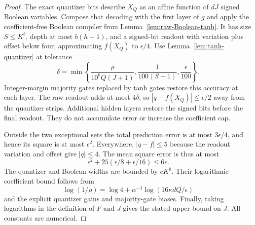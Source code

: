 \begin{proof}
The exact quantizer bits describe $X_Q$ as an affine function of
$dJ$ signed Boolean variables. Compose that decoding with the first
layer of $g$ and apply the coefficient-free Boolean compiler from
Lemma~\ref{lem:raw-Boolean-tanh}. It has size $S\le K^b$, depth
at most $b(h+1)$, and a signed-bit readout with variation plus offset
below four, approximating $f(X_Q)$ to $\epsilon/4$.
Use Lemma~\ref{lem:tanh-quantizer} at tolerance
\[
 \delta=\min\left\{\frac{\rho}{10^6Q(J+1)},
                   \frac1{100(S+1)},\frac\epsilon{100}\right\}.
\]
Integer-margin majority gates replaced by tanh gates restore this
accuracy at each layer. The raw readout adds at most $4\delta$,
so $|q-f(X_Q)|\le\epsilon/2$ away from the quantizer strips.
Additional hidden layers restore the signed bits before the final
readout. They do not accumulate error or increase the coefficient cap.

Outside the two exceptional sets the total prediction error is at
most $3\epsilon/4$, and hence its square is at most $\epsilon^2$.
Everywhere, $|q-f|\le5$ because the readout variation and offset
give $|q|\le4$. The mean square error is thus at most
\[
 \epsilon^2+25(\epsilon/8+\epsilon/16)\le6\epsilon.
\]
The quantizer and Boolean widths are bounded by $cK^b$.
Their logarithmic coefficient bound follows from
\[
 \log(1/\rho)
 =\log4+\alpha^{-1}\log(16\kappa dQ/\epsilon)
\]
and the explicit quantizer gains and majority-gate biases.
Finally, taking logarithms in the definition of $F$ and $J$ gives
the stated upper bound on $J$. All constants are numerical.
\end{proof}


